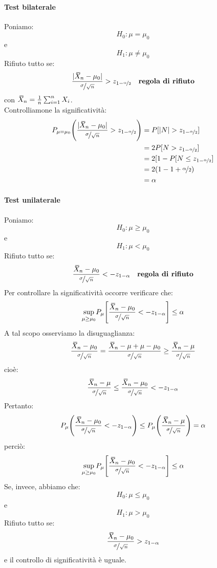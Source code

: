 \documentclass[12pt]{report}
\newcommand{\wbar}[1]{%
	\accentset{\mbox{\rule{0.55em}{0.5pt}}}{#1}%
}
\begin{document}
		\paragraph{Test bilaterale} Poniamo:
		\[
		H_0: \mu = \mu_0
		\]
		e
		\[
		H_1: \mu \neq \mu_0
		\]
		Rifiuto tutto se:
		\[
		\frac{|\wbar{X}_n - \mu_0|}{\nicefrac{\sigma}{\sqrt{n}}} > z_{1 - \nicefrac{\alpha}{2}} \quad \textbf{regola di rifiuto}
		\]
		con $\wbar{X}_n = \frac{1}{n}\sum_{i=1}^{n}X_i$. \\
		Controlliamone la significatività:
		\begin{align*}
			P_{\mu = \mu_0}\Bigg(\frac{|\wbar{X}_n - \mu_0|}{\nicefrac{\sigma}{\sqrt{n}}} > z_{1 - \nicefrac{\alpha}{2}}\Bigg) &= P[|N| > z_{1-\nicefrac{\alpha}{2}}] \\
			&= 2P[N > z_{1-\nicefrac{\alpha}{2}}] \\
			&= 2[1 - P[N \leq z_{1-\nicefrac{\alpha}{2}}] \\
			&= 2(1 - 1 + \nicefrac{\alpha}{2}) \\
			&= \alpha
		\end{align*}
	\paragraph{Test unilaterale} Poniamo:
		\[
		H_0: \mu \geq \mu_0
		\]
		e
		\[
		H_1: \mu < \mu_0
		\]
		Rifiuto tutto se:
		\[
		\frac{\wbar{X}_n - \mu_0}{\nicefrac{\sigma}{\sqrt{n}}} < -z_{1 - \alpha} \quad \textbf{regola di rifiuto}
		\]
		Per controllare la significatività occorre verificare che:
		\[
		\underset{\mu \geq \mu_0}{\sup}P_{\mu}\Bigg[\frac{\wbar{X}_n - \mu_0}{\nicefrac{\sigma}{\sqrt{n}}} < -z_{1-\alpha}\Bigg] \leq \alpha
		\]
		A tal scopo osserviamo la disuguaglianza:
		\begin{align*}
			\frac{\wbar{X}_n - \mu_0}{\nicefrac{\sigma}{\sqrt{n}}} = \frac{\wbar{X}_n - \mu + \mu - \mu_0}{\nicefrac{\sigma}{\sqrt{n}}} \geq \frac{\wbar{X}_n - \mu}{\nicefrac{\sigma}{\sqrt{n}}}
		\end{align*}
		cioè:
		\[
		\frac{\wbar{X}_n - \mu}{\nicefrac{\sigma}{\sqrt{n}}} \leq \frac{\wbar{X}_n - \mu_0}{\nicefrac{\sigma}{\sqrt{n}}} < -z_{1 - \alpha}
		\]
		Pertanto:
		\begin{align*}
			P_\mu\Bigg(\frac{\wbar{X}_n - \mu_0}{\nicefrac{\sigma}{\sqrt{n}}} < -z_{1-\alpha} \Bigg) \leq P_\mu\Bigg(\frac{\wbar{X}_n - \mu}{\nicefrac{\sigma}{\sqrt{n}}}\Bigg) = \alpha
		\end{align*}
		perciò:
		\[
	\underset{\mu \geq \mu_0}{\sup}P_{\mu}\Bigg[\frac{\wbar{X}_n - \mu_0}{\nicefrac{\sigma}{\sqrt{n}}} < -z_{1-\alpha}\Bigg] \leq \alpha
		\]
		Se, invece, abbiamo che:
		\[
		H_0: \mu \leq \mu_0
		\]
		e
		\[
		H_1: \mu > \mu_0
		\]
		Rifiuto tutto se:
		\[
 		\frac{\wbar{X}_n - \mu_0}{\nicefrac{\sigma}{\sqrt{n}}} > z_{1-\alpha}
		\]
		e il controllo di significatività è uguale.
\end{document}
